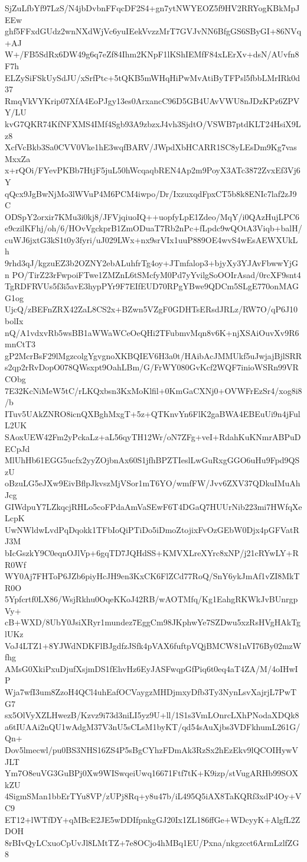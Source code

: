 SjZuLfbYf97LzS/N4jbDvbnFFqcDF2S4+gn7ytNWYEOZ5f9HV2RRYogKBkMpJEEw
ghf5FFxdGUdz2wnNXdWjVc6yuIEekVvzzMrT7GVJvNN6BfgGS6SByGI+86NVq+AJ
W+/FB5SdRx6DW49g6q7eZf84Ihm2KNpF1lKShIEMfF84xLErXv+dsN/AUvfn8F7h
ELZySiFSkUySdJU/xSrfPtc+5tQKB5mWHqHiPwMvAtiByTFPsl5fbbLMrIRk0d37
RmqVkVYKrip07XfA4EoPJgy13es0ArxancC96D5GB4UAvVWU8nJDzKPz6ZPVY/LU
kvG7QKR74KfNFXMS4IMf4Sgb93A9zbzxJ4vh3SjdtO/VSWB7ptdKLT24HsiX9Lz8
XcfVcBkb3Sa0CVV0Vke1hE3wqfBARV/JWpdXbHCARR1SC8yLEsDm9Kg7vasMxxZa
x+rQOi/FYevPKBb7HtjF5juL50hWcqaqbREN4Ap2m9PoyX3ATc3872ZvxEf3Vj6Y
qQcx9JgBwNjMo3lWVuP4M6PCM4iwpo/Dr/IxzuxqdFpxCT5b8k8ENIc7laf2zJ9C
ODSpY2orxir7KMu3i0kj8/JFVjqiuoIQ++uopfyLpE1Zdeo/MqY/i0QAzHujLPC6
e9czilKFhj/oh/6/HOvVgckprB1ZmODuaT7Rb2nPc+fLpdc9wQOtA3Viqb+balH/
cuWJ6jxtG3kS1t0y3fyri/uJ029LWx+nx9srVIx1uuP889OE4wvS4wEsAEWXUkLh
9rhd3qJ/kgzuEZ3b2OZNY2ebALuhfrTg4oy+JTmfalop3+bjyXy3YJAvFbwwYjGn
PO/TirZ23rFwpoiFTwe1ZMZnL6tSMcfyM0Pd7yYvilgSoOOIrAsad/0rcXF9snt4
TgRDFRVUs5f3i5avE3hypPYr9F7EIfEUD70RPgYBwe9QDCm5SLgE770onMAGG1og
UjcQ/zBEFnZRX42ZaL8CS2x+BZwn5VZgF0GDHTsERsdJRLz/RW7O/qP6J10bolIx
nQ/A1vdxvRb5wsBB1aWWaWCeOeQHi2TFubmvMqn8v6K+njXSAiOuvXv9R6mnCtT3
gP2McrBsF29lMgzcolgYgvgnoXKBQIEV6H3a0t/HAibAcJMMUkf5uJwjajBjlSRR
s2qp2rRvDopO078QWsxpt9OahLBm/G/FrWY080GvKcf2WQF7inioWSRn99VRCObg
7E32KcNiMeW5tC/rLKQxbsn3KxMoKlfil+0KmGaCXNj0+OVWFrEzSr4/xog8i8/b
ITuv5UAkZNRO8icnQXBghMxgT+5z+QTKnvYn6FlK2gaBWA4EBEuUi9n4jFulL2UK
SAoxUEW42Fm2yPckaLz+aL56qyTH12Wr/oN7ZFg+veI+RdahKuKNmrABPuDECpJd
MlUhHb61EGG5ucfx2yyZOjbnAx60S1jfhBPZTIeslLwGuRxgGGO6uHu9Fpd9QSzU
oBzuLG5eJXw9EivBflpJkvszMjVSor1mT6YO/wmfFW/Jvv6ZXV37QDkuIMuAhJcg
GIWdpuY7LZkqcjRHLo5coFPdaAmVaSEwF6T4DGaQ7HUUrNib223mi7HWfqXeLcpK
UwNWldwLvdPqDqokk1TFbIoQiPTiDo5iDmoZtojixFvOzGEbW0Djx4pGFVatRJ3M
bIcGszkY9C0eqnOJlVp+6gqTD7JQHdSS+KMVXLreXYrc8xNP/j21cRYwLY+RR0Wf
WY0Aj7FHToP6JZb6piyHcJH9en3KxCK6FlZCd77RoQ/SnY6ykJmAf1vZI8MkTR0O
5Ypfcrtf0LX86/WsjRkhu0OqeKKoJ42RB/wAOTMfq/Kg1EahgRKWkJvBUnrgpVy+
cB+WXD/8UbY0JsiXRyr1mundez7EggCm98JKphwYe7SZDwu5xzRsHVgHAkTglUKz
VoJ4LTZ1+8YJWdNDKFlBJgdfzJSfk4pVAX6fuftpVQjBMCW81nVI76By02mzWfhg
AMsG0XkiPxuDjufXsjmDS1fEhvHz6EyJASFwqpGfPiq6t0eq4aT4ZA/M/4oIHwIP
Wja7wfI3um8ZzoH4QCl4uhEafOCVaygzMHDjmxyDfb3Ty3NynLsvXajrjL7PwTG7
sx5OlVyXZLHwezB/Kzvz9i73d3niLI5yz9U+ll/1S1s3VmLOnrcLXhPNodaXDQk8
a6tIUAAi2nQU1wAdgM37V3nU5sCLsM1byKT/qd54sAuXjbs3VDFkhumL261G/Qn+
Dov5lmecwl/pu0BS3NHS16ZS4P5sBgCYhzFDmAk3RzSx2hEzEkv9lQCOIHywVJLT
Ym7O8euVG3GuBPj0Xw9WISwqeiUwq16671Ftf7tK+K9izp/stVugARHb99SOXkZU
4SigmSMan1bbErTYu8VP/zUPj8Rq+y8u47b/iL495Q5iAX8TaKQRf3xdP4Oy+VC9
ET12+lWTfDY+qMBcE2JE5wDDIfpnkgGJ20Ix1ZL186ffGe+WDcyyK+AlgfL2ZDOH
8rBIvQyLCxuoCpUvJl8LMtTZ+7e8OCjo4hMBq1EU/Pxna/nkgzcct6ArmLzlfZG8
